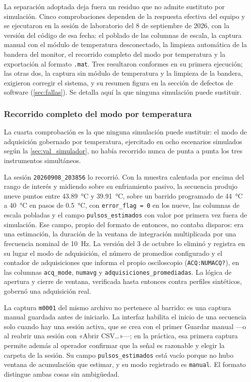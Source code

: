 La separación adoptada deja fuera un residuo que no admite sustituto
por simulación. Cinco comprobaciones dependen de la respuesta efectiva
del equipo y se ejecutaron en la sesión de laboratorio del 8 de
septiembre de 2026, con la versión del código de esa fecha: el poblado
de las columnas de escala, la captura manual con el módulo de
temperatura desconectado, la limpieza automática de la bandera del
monitor, el recorrido completo del modo por temperatura y la
exportación al formato \texttt{.mat}. Tres resultaron conformes en su
primera ejecución; las otras dos, la captura sin módulo de temperatura
y la limpieza de la bandera, exigieron corregir el sistema, y
su resumen figura en la sección de defectos de software
(\cref{sec:fallas}). Se detalla aquí la que ninguna simulación puede
sustituir.

\subsubsection*{Recorrido completo del modo por temperatura}

La cuarta comprobación es la que ninguna simulación puede sustituir:
el modo de adquisición gobernado por temperatura, ejercitado en ocho
escenarios simulados según la \cref{sec:val_simulador}, no había recorrido nunca
de punta a punta los tres instrumentos simultáneos.

La sesión \texttt{20260908\_203856} lo recorrió. Con la muestra
calentada por encima del rango de interés y midiendo sobre su
enfriamiento pasivo, la secuencia produjo nueve puntos entre
\SI{43.89}{\celsius} y \SI{39.91}{\celsius}, sobre un barrido
programado de \SI{44}{\celsius} a \SI{40}{\celsius} en pasos de
\SI{0.5}{\celsius}, con \texttt{error\_flag = 0} en los nueve, las
columnas de escala pobladas y el campo \texttt{pulsos\_estimados}
con valor por primera vez fuera de simulación. Ese campo, propio del
formato de entonces, no contaba disparos: era una estimación, la
duración de la ventana de integración multiplicada por una frecuencia
nominal de \SI{10}{\hertz}. La versión del 3 de octubre lo eliminó y registra
en su lugar el modo de adquisición, el número de promedios configurado
y el contador de adquisiciones que informa el propio osciloscopio
(\texttt{ACQ:NUMACQ?}), en las columnas \texttt{acq\_mode},
\texttt{numavg} y \texttt{adquisiciones\_promediadas}. La lógica de apertura y cierre de ventana, verificada hasta
entonces contra perfiles sintéticos, gobernó una adquisición real.

La captura \texttt{m0001} del mismo archivo no pertenece al barrido:
es una captura manual guardada antes de iniciarlo. La interfaz
habilita el inicio de una secuencia solo cuando hay una sesión activa,
que se crea con el primer Guardar manual ---o al reabrir una sesión
con «Abrir CSV…»---; en la práctica, esa primera captura permite
además al operador confirmar que la señal es razonable y elegir la
carpeta de la sesión. Su campo \texttt{pulsos\_estimados} está vacío
porque no hubo ventana de acumulación que estimar, y su modo
registrado es \texttt{manual}. El
formato distingue ambas cosas sin ambigüedad.

